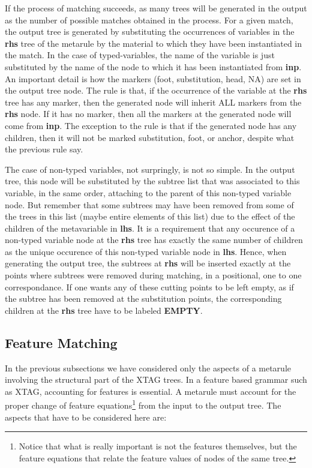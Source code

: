 If the process of matching succeeds, as many trees will be generated in the
output as the number of possible matches obtained in the process. For a 
given match, the output tree is generated by substituting the occurrences of variables in the {\bf rhs} tree
of the metarule by the material to which they have
been instantiated in the match. In the case of typed-variables,
the name of the variable is just substituted by the name of the node to which
it has been instantiated from {\bf inp}. An important detail is how the
markers (foot, substitution, head, NA) are set in the output tree 
node. The rule is that, if the occurrence of the variable at the {\bf rhs}
tree has any marker, then the generated node will inherit ALL 
markers from the {\bf rhs} node. If it has no marker, then all the markers 
at the generated node will come from {\bf inp}. The exception to the rule is 
that if the generated node has any children, then it will not be marked
substitution, foot, or anchor, despite what the previous rule say.

The case of non-typed variables, not surpringly, is not so simple.  In the
output tree, this node will be substituted by the subtree list that was
associated to this variable, in the same order, attaching to the parent of this
non-typed variable node.  But remember that some subtrees may have been removed
from some of the trees in this list (maybe entire elements of this list) due to
the effect of the children of the metavariable in {\bf lhs}.  It is a
requirement that any occurence of a non-typed variable node at the {\bf rhs}
tree has exactly the same number of children as the unique occurence of this
non-typed variable node in {\bf lhs}. Hence, when generating the output tree,
the subtrees at {\bf rhs} will be inserted exactly at the points where subtrees
were removed during matching, in a positional, one to one correspondance. If
one wants any of these cutting points to be left empty, as if the subtree has
been removed at the substitution points, the corresponding children at the {\bf
rhs} tree have to be labeled {\bf EMPTY}.

\subsection{Feature Matching}

In the previous subsections we have considered only the aspects of a metarule
involving the structural part of the XTAG trees. In a feature based grammar
such as XTAG, accounting for features is essential. A metarule must account for
the proper change of feature equations\footnote{Notice that what is really
important is not the features themselves, but the feature equations that relate
the feature values of nodes of the same tree.} from the input to the output
tree.  The aspects that have to be considered here are:

